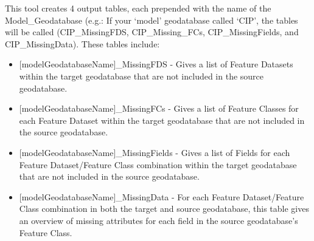 \documentclass[openany]{book}
\providecommand{\tightlist}{%
  \setlength{\itemsep}{0pt}\setlength{\parskip}{0pt}}
\theoremstyle{definition}
\theoremstyle{definition}
\theoremstyle{definition}
\theoremstyle{remark}
\begin{document}
This tool creates 4 output tables, each prepended with the name of the
Model\_Geodatabase (e.g.: If your `model' geodatabase called `CIP', the
tables will be called (CIP\_MissingFDS, CIP\_Missing\_FCs,
CIP\_MissingFields, and CIP\_MissingData). These tables include:

\begin{itemize}
\tightlist
\item
  {[}modelGeodatabaseName{]}\_MissingFDS - Gives a list of Feature
  Datasets within the target geodatabase that are not included in the
  source geodatabase.\\
\item
  {[}modelGeodatabaseName{]}\_MissingFCs - Gives a list of Feature
  Classes for each Feature Dataset within the target geodatabase that
  are not included in the source geodatabase.\\
\item
  {[}modelGeodatabaseName{]}\_MissingFields - Gives a list of Fields for
  each Feature Dataset/Feature Class combination within the target
  geodatabase that are not included in the source geodatabase.\\
\item
  {[}modelGeodatabaseName{]}\_MissingData - For each Feature
  Dataset/Feature Class combination in both the target and source
  geodatabase, this table gives an overview of missing attributes for
  each field in the source geodatabase's Feature Class.


\end{itemize}
\end{document}
